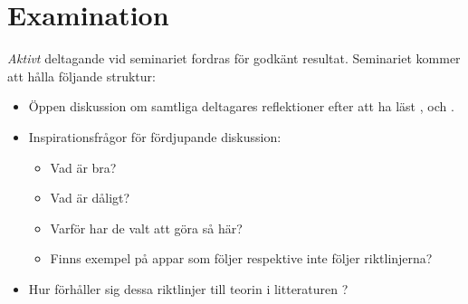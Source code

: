 \documentclass[a4paper,logo,nocourse]{miunasgn}
\begin{document}
\section{Examination}
\label{sec:Examination}
\emph{Aktivt} deltagande vid seminariet fordras för godkänt resultat.
Seminariet kommer att hålla följande struktur:
\begin{itemize}
  \item Öppen diskussion om samtliga deltagares reflektioner efter att ha läst 
    \cite{Nokia2011n9u}, \cite{Android2012d} och \cite{Apple2012hig}.

  \item Inspirationsfrågor för fördjupande diskussion:
    \begin{itemize}
      \item Vad är bra?
      \item Vad är dåligt?
      \item Varför har de valt att göra så här?
      \item Finns exempel på appar som följer respektive inte följer 
        riktlinjerna?
    \end{itemize}

  \item Hur förhåller sig dessa riktlinjer till teorin i litteraturen 
    \citep{Sharp2011idb}?
\end{itemize}


\printbibliography
\end{document}
